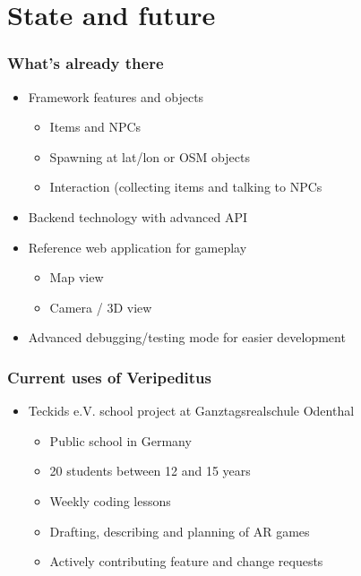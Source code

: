 \documentclass[aspectratio=43]{beamer}
\begin{document}
{ \section{State and future}

 \begin{frame}
  \frametitle{What's already there}

  \begin{itemize}
   \item{Framework features and objects
    \begin{itemize}
     \item{Items and NPCs}
     \item{Spawning at lat/lon or OSM objects}
     \item{Interaction (collecting items and talking to NPCs}
    \end{itemize}
   }
   \item{Backend technology with advanced API}
   \item{Reference web application for gameplay
    \begin{itemize}
     \item{Map view}
     \item{Camera / 3D view}
    \end{itemize}
   }
   \item{Advanced debugging/testing mode for easier development}
  \end{itemize}
 \end{frame}


 \begin{frame}
  \frametitle{Current uses of Veripeditus}

  \begin{itemize}
   \item{Teckids e.V. school project at Ganztagsrealschule Odenthal
    \begin{itemize}
     \item{Public school in Germany}
     \item{20 students between 12 and 15 years}
     \item{Weekly coding lessons}
     \item{Drafting, describing and planning of AR games}
     \item{Actively contributing feature and change requests}
    \end{itemize}
   }
  \end{itemize}
 \end{frame}

}
\end{document}
